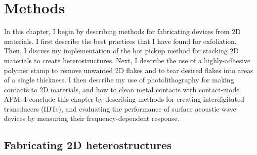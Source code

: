 \documentclass{beavtex_dub_edit}
\begin{document}
\begin{center}

    \linespread{1.0}\selectfont

\end{center}






\chapter{Methods} \label{methods chapter}
In this chapter, I begin by describing methods for fabricating devices from 2D materials. I first describe the best practices that I have found for exfoliation. Then, I discuss my implementation of the hot pickup method for stacking 2D materials to create heterostructures. Next, I describe the use of a highly-adhesive polymer stamp to remove unwanted 2D flakes and to tear desired flakes into areas of a single thickness. I then describe my use of photolithography for making contacts to 2D materials, and how to clean metal contacts with contact-mode AFM. I conclude this chapter by describing methods for creating interdigitated transducers (IDTs), and evaluating the performance of surface acoustic wave devices by measuring their frequency-dependent response.

\section{Fabricating 2D heterostructures} \label{fabricating 2D devices}
\end{document}
